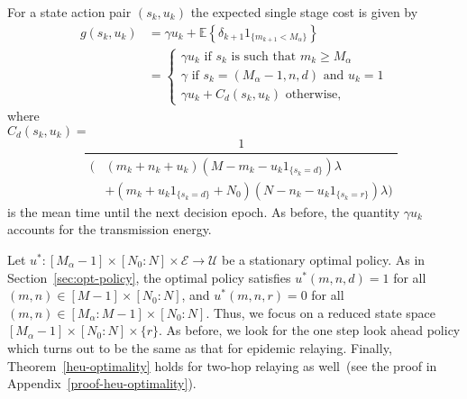 \documentclass[10pt,journal,letterpaper]{IEEEtran}
\begin{document}
For a state action pair $(s_k,u_k)$
the expected single stage cost is given by
\begin{align*}
g(s_k,u_k) &= \gamma u_k + \mathbb{E}\left\{\delta_{k+1}1_{\{m_{k+1} < M_{\alpha}\}}\right\}\\
           &= \begin{cases}
             \gamma u_k \mbox{ if }  s_k \mbox{ is such that } m_k \geq M_{\alpha} \\
                 \gamma \mbox{ if } s_k  = (M_{\alpha}-1,n,d) \mbox{ and } u_k = 1\\
                 \gamma u_k + C_d(s_k,u_k) \mbox{ otherwise},\end{cases}
\end{align*}
where \\
$C_d(s_k,u_k) = $
\begin{equation*}
\ \ \ \ \ \frac{1}{\begin{split}\big(&(m_k + n_k + u_k)(M-m_k-u_k 1_{\{s_k = d\}})\lambda\\
                                     & + (m_k + u_k1_{\{s_k = d\}} + N_0)(N -n_k-u_k 1_{\{s_k = r\}})\lambda\big)\end{split}}
\end{equation*}
 is the mean time until the next decision epoch.
As before, the quantity $\gamma u_k$ accounts for the
transmission energy.

Let $u^{\ast}: [M_{\alpha}-1] \times [N_0:N] \times \mathcal{E}
\rightarrow \mathcal{U}$ be a stationary optimal policy. As in
Section~\ref{sec:opt-policy}, the optimal policy satisfies
$u^{\ast}(m,n,d) = 1$ for all $(m,n) \in [M-1] \times [N_0:N]$, and
$u^{\ast}(m,n,r) = 0$ for all $(m,n) \in [M_{\alpha}:M-1] \times
[N_0:N]$. Thus, we focus on a reduced state space $[M_{\alpha}-1]
\times [N_0:N] \times \{r\}$. As before, we look for the one step
look ahead policy which turns out to be the same as that for
epidemic relaying. Finally, Theorem~\ref{heu-optimality} holds for
two-hop relaying as well~(see the proof in
Appendix~\ref{proof-heu-optimality}).
\end{document}
